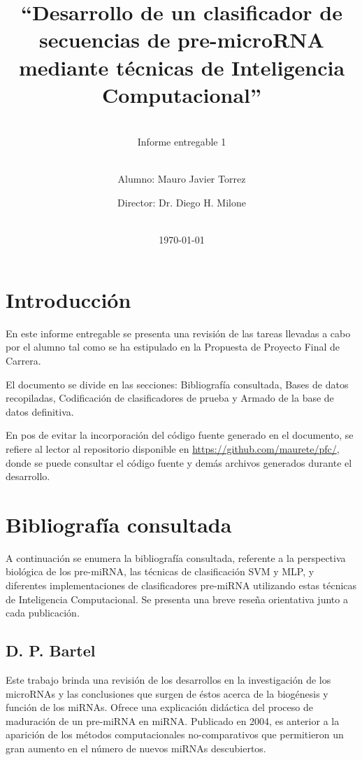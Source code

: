 \documentclass[12pt,bibliography=oldstyle,DIV=12,parskip=half-,titlepage]{scrartcl}
\begin{document}
%
%
\titlehead{\center\large
    Universidad Nacional del Litoral\\
    Facultad de Ingeniería y Ciencias Hídricas
}
%
%
\title{\LARGE ``Desarrollo de un clasificador de secuencias de pre-microRNA
  mediante técnicas de Inteligencia Computacional''}
\subject{Proyecto Final de Carrera\\Ingeniería en
  Informática}
\subtitle{~\\[.2ex]Informe entregable 1\\[.2ex]~}
\author{{Alumno: Mauro Javier Torrez}\and{Director: Dr. Diego H. Milone}}
%
\date{~\\[2em]\today}
%
\renewcommand*{\titlepagestyle}{empty}
\maketitle
\setcounter{page}{1}
%
%
%
%
\section{Introducción}
En este informe entregable se presenta una revisión de las tareas
llevadas a cabo por el alumno tal como se ha estipulado en la
Propuesta de Proyecto Final de Carrera.

El documento se divide en las secciones: Bibliografía consultada,
Bases de datos recopiladas, Codificación de clasificadores de prueba
y Armado de la base de datos definitiva.

En pos de evitar la incorporación del código fuente generado en el
documento, se refiere al lector al repositorio disponible en
\url{https://github.com/maurete/pfc/}, donde se puede consultar
el código fuente y demás archivos generados durante el desarrollo.
%
%
%
%
\section{Bibliografía consultada}
\label{bibliografia}
%
A continuación se enumera la bibliografía consultada, referente a la
perspectiva biológica de los pre-miRNA, las técnicas de clasificación
SVM y MLP, y diferentes implementaciones de clasificadores pre-miRNA
utilizando estas técnicas de Inteligencia Computacional. Se presenta
una breve reseña orientativa junto a cada publicación.
%
\subsection{D. P. Bartel \cite{bartel116}}
Este trabajo brinda una revisión de los desarrollos en la
investigación de los microRNAs y las conclusiones que surgen de éstos
acerca de la biogénesis y función de los miRNAs.  Ofrece una
explicación didáctica del proceso de maduración de un pre-miRNA en
miRNA.  Publicado en 2004, es anterior a la aparición de los métodos
computacionales no-comparativos que permitieron un gran aumento en el
número de nuevos miRNAs descubiertos.
%
\end{document}
